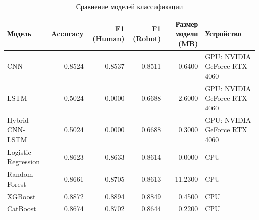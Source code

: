 \begin{table}[htbp]
\centering
\caption{Сравнение моделей классификации}
\begin{tabular}{lrrrrl}
\toprule
Модель & Accuracy & F1 (Human) & F1 (Robot) & Размер модели (MB) & Устройство \\
\midrule
CNN & 0.8524 & 0.8537 & 0.8511 & 0.6400 & GPU: NVIDIA GeForce RTX 4060 \\
LSTM & 0.5024 & 0.0000 & 0.6688 & 2.6000 & GPU: NVIDIA GeForce RTX 4060 \\
Hybrid CNN-LSTM & 0.5024 & 0.0000 & 0.6688 & 0.3000 & GPU: NVIDIA GeForce RTX 4060 \\
Logistic Regression & 0.8623 & 0.8633 & 0.8614 & 0.0000 & CPU \\
Random Forest & 0.8661 & 0.8705 & 0.8613 & 11.2300 & CPU \\
XGBoost & 0.8872 & 0.8894 & 0.8849 & 0.4500 & CPU \\
CatBoost & 0.8674 & 0.8702 & 0.8644 & 0.2200 & CPU \\
\bottomrule
\end{tabular}
\label{tab:models_comparison}
\end{table}
